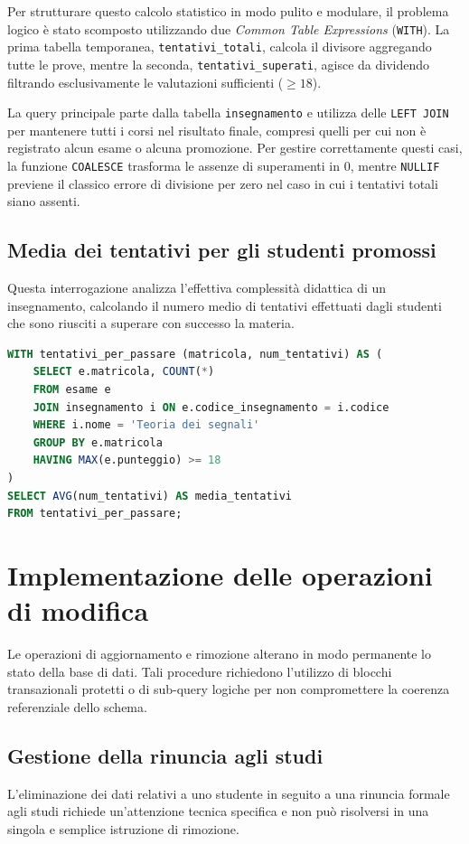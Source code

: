 Per strutturare questo calcolo statistico in modo pulito e modulare, il problema logico è stato scomposto utilizzando due \textit{Common Table Expressions} (\texttt{WITH}).
La prima tabella temporanea, \texttt{tentativi\_totali}, calcola il divisore aggregando tutte le prove, mentre la seconda, \texttt{tentativi\_superati}, agisce da dividendo filtrando esclusivamente le valutazioni sufficienti ($\ge 18$).

La query principale parte dalla tabella \texttt{insegnamento} e utilizza delle \texttt{LEFT JOIN} per mantenere tutti i corsi nel risultato finale, compresi quelli per cui non è registrato alcun esame o alcuna promozione. Per gestire correttamente questi casi, la funzione \texttt{COALESCE} trasforma le assenze di superamenti in 0, mentre \texttt{NULLIF} previene il classico errore di divisione per zero nel caso in cui i tentativi totali siano assenti.

\subsection{Media dei tentativi per gli studenti promossi}
\label{ssec:media-dei-tentativi-per-gli-studenti-promossi}
Questa interrogazione analizza l'effettiva complessità didattica di un insegnamento, calcolando il numero medio di tentativi effettuati dagli studenti che sono riusciti a superare con successo la materia.

\begin{lstlisting}[language=SQL]
WITH tentativi_per_passare (matricola, num_tentativi) AS (
    SELECT e.matricola, COUNT(*)
    FROM esame e
    JOIN insegnamento i ON e.codice_insegnamento = i.codice
    WHERE i.nome = 'Teoria dei segnali'
    GROUP BY e.matricola
    HAVING MAX(e.punteggio) >= 18
)
SELECT AVG(num_tentativi) AS media_tentativi
FROM tentativi_per_passare;
\end{lstlisting}

\section{Implementazione delle operazioni di modifica}
\label{sec:implementazione-delle-operazioni-di-modifica}

Le operazioni di aggiornamento e rimozione alterano in modo permanente lo stato della base di dati.
Tali procedure richiedono l'utilizzo di blocchi transazionali protetti o di sub-query logiche per non compromettere la coerenza referenziale dello schema.

\subsection{Gestione della rinuncia agli studi}
\label{ssec:gestione-della-rinuncia-agli-studi}
L'eliminazione dei dati relativi a uno studente in seguito a una rinuncia formale agli studi richiede un'attenzione tecnica specifica e non può risolversi in una singola e semplice istruzione di rimozione.

